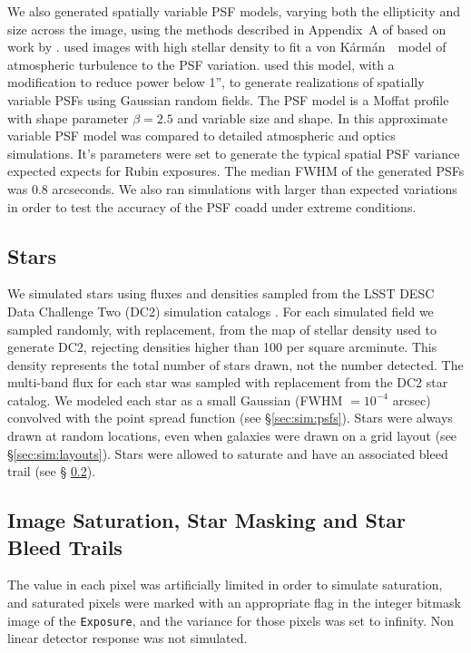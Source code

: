 \documentclass[twocolumn,twocolappendix,astrosym]{openjournal}
\newcommand{\calexp}{\texttt{Exposure}}
\newcommand{\vonkarman}{{von K\'arm\'an}~}
\begin{document}
We also generated spatially variable PSF models, varying both the
ellipticity and size across the image, using the methods described in
Appendix~A of \citet{mdet20} based on work by \citet{heymans2012}.
\citet{heymans2012} used images with high stellar density to fit a \vonkarman\
model of atmospheric turbulence to the PSF variation. \citet{mdet20}
used this model, with a modification to reduce power below 1'', to generate
realizations of spatially variable PSFs using Gaussian random fields. The PSF
model is a Moffat \citep{Moffat1969} profile with shape parameter $\beta=2.5$
and variable size and shape. In \citet{mdet20} this approximate
variable PSF model was compared to detailed atmospheric and optics simulations.
It's parameters were set to generate the typical spatial PSF variance expected
expects for Rubin exposures. The median FWHM of the generated PSFs was 0.8
arcseconds.  We also ran simulations with larger than expected variations in
order to test the accuracy of the PSF coadd under extreme conditions.

\subsection{Stars} \label{sec:sim:stars}

We simulated stars using fluxes and densities sampled from the LSST DESC Data
Challenge Two (DC2) simulation catalogs \citep{DC2Abolfathi2021}.  For each
simulated field we sampled randomly, with replacement, from the map of stellar
density used to generate DC2, rejecting densities higher than 100 per square
arcminute.  This density represents the total number of stars drawn, not the
number detected.  The multi-band flux for each star was sampled with
replacement from the DC2 star catalog.  We modeled each star as a small
Gaussian (FWHM $= 10^{-4}$ arcsec) convolved with the point spread function
(see \S \ref{sec:sim:psfs}).  Stars were always drawn at random locations, even
when galaxies were drawn on a grid layout (see \S \ref{sec:sim:layouts}).
Stars were allowed to saturate and have an associated bleed trail (see \S
\ref{sec:sim:satbleeds}).

\subsection{Image Saturation, Star Masking and Star Bleed Trails} \label{sec:sim:satbleeds}

The value in each pixel was artificially limited in order to simulate
saturation, and saturated pixels were marked with an appropriate flag in the
integer bitmask image of the \calexp, and the variance for those
pixels was set to infinity.  Non linear detector response was not simulated.
\end{document}
